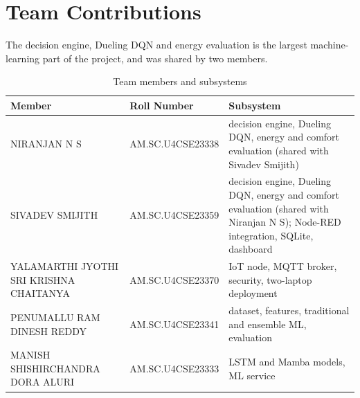\documentclass[12pt,a4paper,oneside]{report}
\begin{document}
\section{Team Contributions}
The decision engine, Dueling DQN and energy evaluation is the largest machine-learning part of the project, and was
shared by two members.

\begin{table}[H]
\centering
\caption{Team members and subsystems}
\label{tab:team}
\small
\begin{tabularx}{\textwidth}{@{}L{4.6cm}L{3.7cm}Y@{}}
\toprule
\textbf{Member} & \textbf{Roll Number} & \textbf{Subsystem}\\
\midrule
NIRANJAN N S & AM.SC.U4CSE23338 & decision engine, Dueling DQN, energy and comfort evaluation (shared with Sivadev Smijith)\\
SIVADEV SMIJITH & AM.SC.U4CSE23359 & decision engine, Dueling DQN, energy and comfort evaluation (shared with Niranjan N S); Node-RED integration, SQLite, dashboard\\
YALAMARTHI JYOTHI SRI KRISHNA CHAITANYA & AM.SC.U4CSE23370 & IoT node, MQTT broker, security, two-laptop deployment\\
PENUMALLU RAM DINESH REDDY & AM.SC.U4CSE23341 & dataset, features, traditional and ensemble ML, evaluation\\
MANISH SHISHIRCHANDRA DORA ALURI & AM.SC.U4CSE23333 & LSTM and Mamba models, ML service\\
\bottomrule
\end{tabularx}
\end{table}

\end{document}
